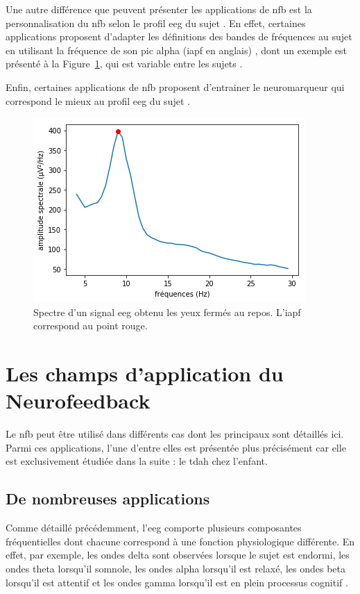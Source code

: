 Une autre différence que peuvent présenter les applications de \gls{nfb} est la personnalisation du \gls{nfb} selon le profil \gls{eeg} du sujet
\citep{Alkoby2017}. En effet, certaines applications proposent d'adapter les définitions des bandes de fréquences au sujet en utilisant la fréquence de son
pic alpha (\gls{iapf} en anglais) \citep{Alkoby2017, Escolano2014, Bazanova2018}, dont un exemple est présenté à la Figure~\ref{Figure:introduction_iapf}, 
qui est variable entre les sujets \citep{Haegens2014, Aurlien2004, Smit2006}. 

Enfin, certaines applications de \gls{nfb} proposent d'entrainer le neuromarqueur qui correspond le mieux au profil \gls{eeg} du sujet 
\citep{Bioulac2019, Kerson2013}. 

\begin{figure}[h!]
  \centering
	\includegraphics[width=0.5\linewidth]{figures/chapter-1/introduction-iapf} 
  \caption{Spectre d'un signal \gls{eeg} obtenu les yeux fermés au repos. L'\gls{iapf} correspond au point rouge.}
  \label{Figure:introduction_iapf}
\end{figure}

\section{Les champs d'application du Neurofeedback} \label{applications_NFB}

Le \gls{nfb} peut être utilisé dans différents cas dont les principaux sont détaillés ici. Parmi ces applications, l'une d'entre elles est présentée 
plus précisément car elle est exclusivement étudiée dans la suite : le \gls{tdah} chez l'enfant.

\subsection{De nombreuses applications}

Comme détaillé précédemment, l'\gls{eeg} comporte plusieurs composantes fréquentielles dont chacune correspond à une fonction physiologique différente.
En effet, par exemple, les ondes delta sont observées lorsque le sujet est endormi, les ondes theta lorsqu'il somnole, les ondes alpha lorsqu'il est relaxé, 
les ondes beta lorsqu'il est attentif et les ondes gamma lorsqu'il est en plein processus cognitif \citep{Marzbani2016}. 

